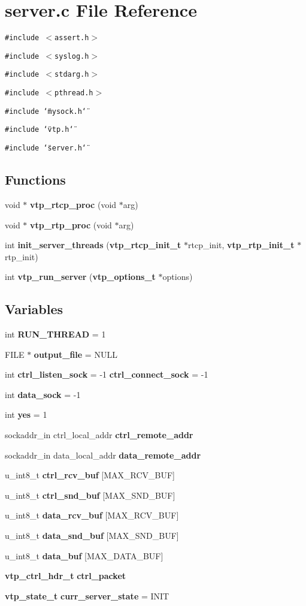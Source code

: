 \section{server.c File Reference}
\label{server_8c}
{\tt \#include $<$assert.h$>$}\par
{\tt \#include $<$syslog.h$>$}\par
{\tt \#include $<$stdarg.h$>$}\par
{\tt \#include $<$pthread.h$>$}\par
{\tt \#include \char`\"{}mysock.h\char`\"{}}\par
{\tt \#include \char`\"{}vtp.h\char`\"{}}\par
{\tt \#include \char`\"{}server.h\char`\"{}}\par
\subsection*{Functions}
\begin{CompactItemize}
\item 
void $\ast$ {\bf vtp\_\-rtcp\_\-proc} (void $\ast$arg)
\item 
void $\ast$ {\bf vtp\_\-rtp\_\-proc} (void $\ast$arg)
\item 
int {\bf init\_\-server\_\-threads} ({\bf vtp\_\-rtcp\_\-init\_\-t} $\ast$rtcp\_\-init, {\bf vtp\_\-rtp\_\-init\_\-t} $\ast$rtp\_\-init)
\item 
int {\bf vtp\_\-run\_\-server} ({\bf vtp\_\-options\_\-t} $\ast$options)
\end{CompactItemize}
\subsection*{Variables}
\begin{CompactItemize}
\item 
int {\bf RUN\_\-THREAD} = 1
\item 
FILE $\ast$ {\bf output\_\-file} = NULL
\item 
int {\bf ctrl\_\-listen\_\-sock} = -1 {\bf ctrl\_\-connect\_\-sock} = -1
\item 
int {\bf data\_\-sock} = -1
\item 
int {\bf yes} = 1
\item 
sockaddr\_\-in ctrl\_\-local\_\-addr {\bf ctrl\_\-remote\_\-addr}
\item 
sockaddr\_\-in data\_\-local\_\-addr {\bf data\_\-remote\_\-addr}
\item 
u\_\-int8\_\-t {\bf ctrl\_\-rcv\_\-buf} [MAX\_\-RCV\_\-BUF]
\item 
u\_\-int8\_\-t {\bf ctrl\_\-snd\_\-buf} [MAX\_\-SND\_\-BUF]
\item 
u\_\-int8\_\-t {\bf data\_\-rcv\_\-buf} [MAX\_\-RCV\_\-BUF]
\item 
u\_\-int8\_\-t {\bf data\_\-snd\_\-buf} [MAX\_\-SND\_\-BUF]
\item 
u\_\-int8\_\-t {\bf data\_\-buf} [MAX\_\-DATA\_\-BUF]
\item 
{\bf vtp\_\-ctrl\_\-hdr\_\-t} {\bf ctrl\_\-packet}
\item 
{\bf vtp\_\-state\_\-t} {\bf curr\_\-server\_\-state} = INIT
\end{CompactItemize}



